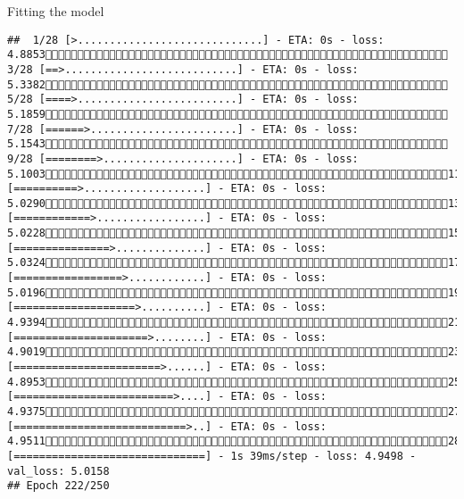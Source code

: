 \documentclass[
  ignorenonframetext,
]{beamer}
\begin{document}
\begin{frame}[fragile]{Fitting the model}
\begin{verbatim}
##  1/28 [>.............................] - ETA: 0s - loss: 4.8853 3/28 [==>...........................] - ETA: 0s - loss: 5.3382 5/28 [====>.........................] - ETA: 0s - loss: 5.1859 7/28 [======>.......................] - ETA: 0s - loss: 5.1543 9/28 [========>.....................] - ETA: 0s - loss: 5.100311/28 [==========>...................] - ETA: 0s - loss: 5.029013/28 [============>.................] - ETA: 0s - loss: 5.022815/28 [===============>..............] - ETA: 0s - loss: 5.032417/28 [=================>............] - ETA: 0s - loss: 5.019619/28 [===================>..........] - ETA: 0s - loss: 4.939421/28 [=====================>........] - ETA: 0s - loss: 4.901923/28 [=======================>......] - ETA: 0s - loss: 4.895325/28 [=========================>....] - ETA: 0s - loss: 4.937527/28 [===========================>..] - ETA: 0s - loss: 4.951128/28 [==============================] - 1s 39ms/step - loss: 4.9498 - val_loss: 5.0158
## Epoch 222/250

\end{verbatim}
\end{frame}
\end{document}
